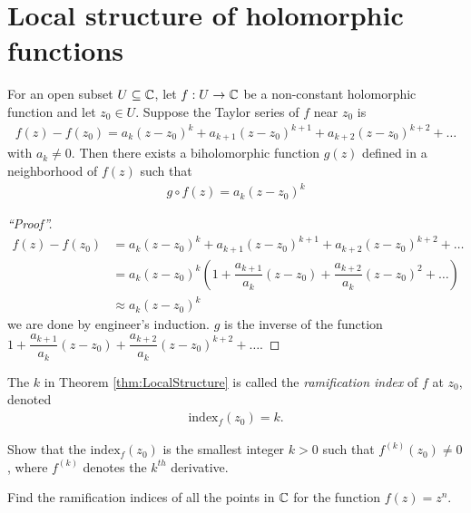 \documentclass{article}
\begin{document}
\section{Local structure of holomorphic functions}
\begin{theorem}
  \label{thm:LocalStructure}
  For an open subset $U \subseteq \mathbb{C}$, let $f: U \rightarrow \mathbb{C}$ be a non-constant holomorphic function and let $z_0 \in U$.
  Suppose the Taylor series of $f$ near $z_0$ is
  \begin{align*}
    f(z) - f(z_0) = a_k (z - z_0)^k + a_{k+1} (z - z_0)^{k+1} + a_{k+2} (z - z_0)^{k+2} + \dots
  \end{align*}
  with $a_k \neq 0$.
  Then there exists a biholomorphic function $g(z)$ defined in a neighborhood of $f(z)$ such that
  \begin{align*}
    g \circ f (z) = a_k(z - z_0)^k
  \end{align*}
\end{theorem}
\begin{proof}[``Proof'']
  \begin{align*}
    f(z) - f(z_0)
    &=
    a_k (z - z_0)^k + a_{k+1} (z - z_0)^{k+1} + a_{k+2} (z - z_0)^{k+2} + \dots \\
    &=
    a_k (z - z_0)^k \left(1 + \dfrac{a_{k+1}}{a_k} (z - z_0) + \dfrac{a_{k+2}}{a_k} (z - z_0)^{2} + \dots \right) \\
    &\approx a_k (z - z_0)^k
  \end{align*}
  we are done by engineer's induction.
  $g$ is the inverse of the function $1 + \dfrac{a_{k+1}}{a_k} (z - z_0) + \dfrac{a_{k+2}}{a_k} (z - z_0)^{k+2} + \dots $.
\end{proof}

  \begin{definition}
    The $k$ in Theorem \ref{thm:LocalStructure} is called the \emph{ramification index} of $f$ at $z_0$, denoted
    \begin{align*}
      \mathrm{index}_{f}(z_0) = k.
    \end{align*}
  \end{definition}

  \begin{qbox}
    Show that the $\mathrm{index}_{f}(z_0)$ is the smallest integer $k > 0$ such that $f^{(k)}(z_0) \neq 0$, where $f^{(k)}$ denotes the $k^{th}$ derivative.
  \end{qbox}

  \begin{qbox}
    Find the ramification indices of all the points in $\mathbb{C}$ for the function $f(z) = z^n$.
  \end{qbox}
\end{document}
